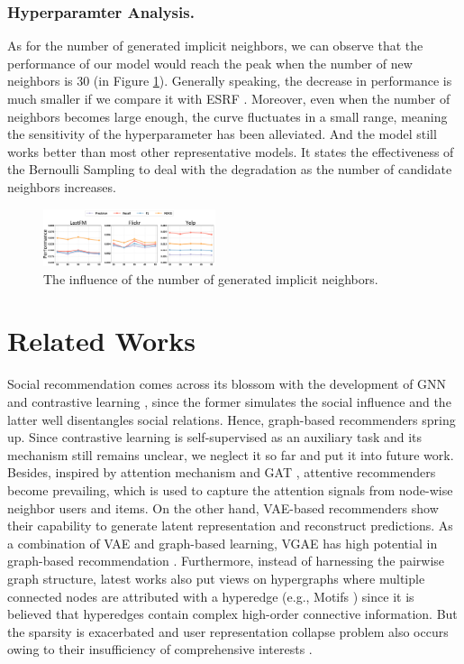 \documentclass[letterpaper]{article} %
\begin{document}
\subsubsection{Hyperparamter Analysis.}
As for the number of generated implicit neighbors, we can observe that the performance of our model would reach the peak when the number of new neighbors is 30 (in Figure \ref{fig_hyper}). Generally speaking, the decrease in performance is much smaller if we compare it with ESRF \cite{ESRF}. Moreover, even when the number of neighbors becomes large enough, the curve fluctuates in a small range, meaning the sensitivity of the hyperparameter has been alleviated. And the model still works better than most other representative models. It states the effectiveness of the Bernoulli Sampling to deal with the degradation as the number of candidate neighbors increases.
\begin{figure}[ht!]
  \centering
  \includegraphics[width=0.45\textwidth]{hyper.pdf} %
  \caption{The influence of the number of generated implicit neighbors.}
  \label{fig_hyper}
\end{figure}

\section{Related Works}
Social recommendation comes across its blossom with the development of GNN \cite{GNN, MPNN} and contrastive learning \cite{sgl}, since the former simulates the social influence and the latter well disentangles social relations. Hence, graph-based recommenders \cite{ngcf,lightgcn} spring up. Since contrastive learning is self-supervised as an auxiliary task and its mechanism still remains unclear\cite{augmentation}, we neglect it so far and put it into future work. Besides, inspired by attention mechanism \cite{attention} and GAT \cite{GAT}, attentive recommenders \cite{diffnet++} become prevailing, which is used to capture the attention signals from node-wise neighbor users and items. On the other hand, VAE-based recommenders \cite{multivae,jova} show their capability to generate latent representation and reconstruct predictions. As a combination of VAE and graph-based learning, VGAE \cite{VGAE} has high potential in graph-based recommendation \cite{vgae_rec}. Furthermore, instead of harnessing the pairwise graph structure, latest works \cite{MHCN, ESRF} also put views on hypergraphs where multiple connected nodes are attributed with a hyperedge (e.g., Motifs \cite{motif}) since it is believed that hyperedges contain complex high-order connective information. But the sparsity is exacerbated and user representation collapse problem also occurs owing to their insufficiency of comprehensive interests \cite{collapse}.
\end{document}
